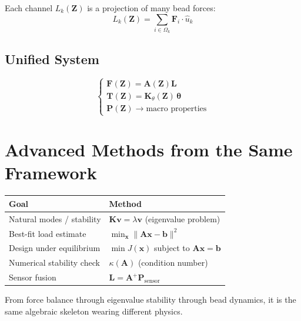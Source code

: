 \documentclass[11pt, letterpaper]{article}
\newcommand{\bL}{\mathbf{L}}
\newcommand{\bA}{\mathbf{A}}
\newcommand{\bP}{\mathbf{P}}
\newcommand{\bK}{\mathbf{K}}
\newcommand{\bx}{\mathbf{x}}
\newcommand{\bF}{\mathbf{F}}
\begin{document}
Each channel $L_k(\mathbf{Z})$ is a projection of many bead forces:
\[
L_k(\mathbf{Z}) = \sum_{i\in\Omega_k} \bF_i \cdot \hat{u}_k
\]

\subsection*{Unified System}

\[
\begin{cases}
\bF(\mathbf{Z}) = \bA(\mathbf{Z})\bL \\[4pt]
\mathbf{T}(\mathbf{Z}) = \bK_\theta(\mathbf{Z})\,\boldsymbol{\theta} \\[4pt]
\mathbf{P}(\mathbf{Z}) \to \text{macro properties}
\end{cases}
\]

\section{Advanced Methods from the Same Framework}

\begin{tabular}{@{}ll@{}}
\toprule
Goal & Method \\
\midrule
Natural modes / stability & $\bK\mathbf{v} = \lambda\mathbf{v}$ (eigenvalue problem) \\
Best-fit load estimate & $\min_{\bx}\|\bA\bx - \mathbf{b}\|^2$ \\
Design under equilibrium & $\min J(\bx)$ subject to $\bA\bx = \mathbf{b}$ \\
Numerical stability check & $\kappa(\bA)$ (condition number) \\
Sensor fusion & $\bL = \bA^+\bP_{\mathrm{sensor}}$ \\
\bottomrule
\end{tabular}

\bigskip\noindent
From force balance through eigenvalue stability through bead dynamics,
it is the same algebraic skeleton wearing different physics.
\end{document}
